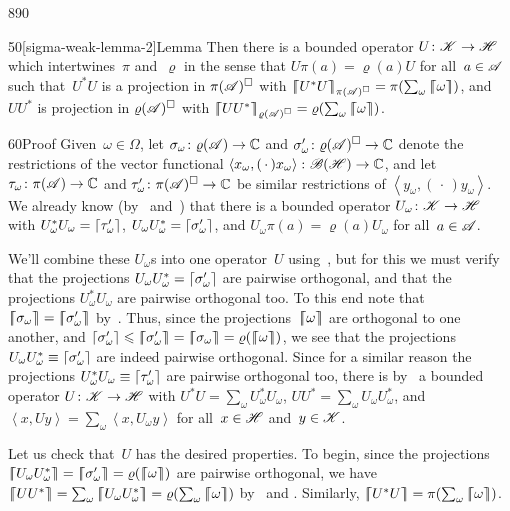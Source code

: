 \begin{parsec}{890}
\begin{point}{50}[sigma-weak-lemma-2]{Lemma}
Then there is a bounded operator $U\colon \mathscr{K}\to\mathscr{H}$
which intertwines~$\pi$ and~$\varrho$
in the sense that $U \pi(a)=\varrho(a) U$
for all~$a\in \mathscr{A}$
such that~$U^*U$
is a projection in
$\pi(\mathscr{A})^\square$
with
$\cceil{U^*U}_{\pi(\scrA)^\square}=\pi(\sum_\omega \cceil{\omega})$,
and 
$UU^*$
is projection in
$\varrho(\mathscr{A})^\square$
with
$\cceil{UU^*}_{\varrho(\scrA)^\square}=\varrho(\sum_\omega \cceil{\omega})$.
\begin{point}{60}{Proof}%
Given~$\omega\in\Omega$,
let $\sigma_\omega\colon \varrho(\mathscr{A})\to \mathbb{C}$
and $\sigma_\omega'\colon \varrho(\mathscr{A})^\square\to\mathbb{C}$
denote the restrictions
of the vector functional $\left<x_\omega,(\,\cdot\,)x_\omega\right>
\colon \mathscr{B}(\mathscr{H})\to\mathbb{C}$,
and let  $\tau_\omega\colon \pi(\mathscr{A})\to \mathbb{C}$
and $\tau_\omega'\colon \pi(\mathscr{A})^\square\to\mathbb{C}$
be similar restrictions
of $\left<y_\omega,(\,\cdot\,)y_\omega\right>$.
We already know (by~
and~)
that
there is
a bounded operator $U_\omega\colon \mathscr{K}\to\mathscr{H}$
with $U_\omega^*U_\omega = \left\lceil\tau_\omega'\right\rceil$,
$U_\omega U_\omega^* = \left\lceil\sigma_\omega'\right\rceil$,
and $U_\omega \pi(a) = \varrho(a) U_\omega$
for all~$a\in\mathscr{A}$.

We'll combine these $U_\omega$s into one operator~$U$
using~, but for this we must
verify that the projections $U_\omega U_\omega^*=\left\lceil\sigma_\omega'\right\rceil$
are pairwise orthogonal,
and that the projections $U_\omega^* U_\omega$
are pairwise orthogonal too.
To this end note that
$\cceil{\sigma_\omega}=\cceil{\sigma_\omega'}$
by~.
Thus, since the projections~$\left\lceil\!\!\left\lceil\omega\right\rceil\!\!\right\rceil$
are orthogonal to one another,
and $\ceil{\sigma_\omega'}\leq \cceil{\sigma_\omega'}
= \cceil{\sigma_\omega} =\varrho(\cceil{\omega})$,
we see that the projections~$U_\omega U^*_\omega \equiv 
\left\lceil\sigma_\omega'\right\rceil$
are indeed pairwise orthogonal.
Since for a similar reason
the projections $U^*_\omega U_\omega
\equiv \left\lceil\tau_\omega'\right\rceil$ are pairwise orthogonal too,
there is by~
a bounded operator $U\colon \mathscr{K}\to\mathscr{H}$
with 
$U^*U = \sum_\omega U_\omega^* U_\omega$,
$UU^* = \sum_\omega U_\omega U_\omega^*$,
and $\left<x,Uy\right>=\sum_\omega \left<x,U_\omega y\right>$
for all~$x\in\mathscr{H}$ and~$y\in \mathscr{K}$.

Let us check that~$U$ has the desired properties.
To begin, since the projections
$\cceil{U_\omega U^*_\omega}=\cceil{\sigma_\omega'}=\varrho(\cceil{\omega})$
are pairwise orthogonal,
we have $\cceil{U U^*}=\sum_\omega \cceil{U_\omega U^*_\omega}
=  \varrho(\sum_\omega \cceil{\omega})$
by~ and
.
Similarly, $\cceil{U^*U}= \pi(\sum_\omega \cceil{\omega})$.


\end{point}
\end{point}
\end{parsec}
